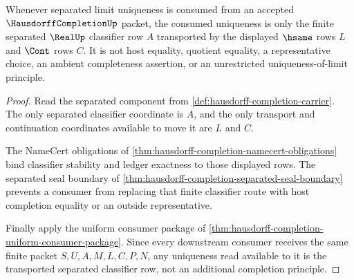 \begin{theorem}
\label{thm:hausdorffcompletion-separated-limit-uniqueness}
Whenever separated limit uniqueness is consumed from an accepted $\HausdorffCompletionUp$ packet, the consumed uniqueness is only the finite separated $\RealUp$ classifier row $A$ transported by the displayed $\hsame$ rows $L$ and $\Cont$ rows $C$. It is not host equality, quotient equality, a representative choice, an ambient completeness assertion, or an unrestricted uniqueness-of-limit principle.
\end{theorem}
\begin{proof}
Read the separated component from \autoref{def:hausdorff-completion-carrier}. The only separated classifier coordinate is $A$, and the only transport and continuation coordinates available to move it are $L$ and $C$.

The NameCert obligations of \autoref{thm:hausdorff-completion-namecert-obligations} bind classifier stability and ledger exactness to those displayed rows. The separated seal boundary of \autoref{thm:hausdorff-completion-separated-seal-boundary} prevents a consumer from replacing that finite classifier route with host completion equality or an outside representative.

Finally apply the uniform consumer package of \autoref{thm:hausdorff-completion-uniform-consumer-package}. Since every downstream consumer receives the same finite packet $S,U,A,M,L,C,P,N$, any uniqueness read available to it is the transported separated classifier row, not an additional completion principle.
\end{proof}

